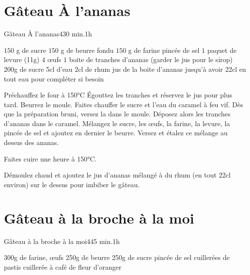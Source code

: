 {\section{Gâteau À l'ananas}
\begin{recette}{Gâteau À l'ananas}{4}{30 min.}{1h}
\begin{ingredients}
\ingredient[gâteau]
\ingredient $150$ g de sucre
\ingredient $150$ g de beurre fondu
\ingredient $150$ g de farine
 pincée de sel
\ingredient $1$ paquet de levure (11g)
\ingredient $4$ œufs
\ingredient $1$ boite de tranches d'ananas (garder le jus pour le sirop)
\ingredient[caramel]
\ingredient 200g de sucre
\ingredient 5cl d'eau
\ingredient 2cl de rhum
\ingredient jus de la boite d'ananas jusqu'à avoir 22cl en tout
\ingredient eau pour compléter si besoin
\end{ingredients}

\begin{preparation}
\etape Préchauffez le four à 150°C
\etape Égouttez les tranches et réservez le jus pour plus tard.
\etape Beurrez le moule. 
\etape Faites chauffer le sucre et l'eau du caramel à feu vif. Dès que la préparation bruni, versez la dans le moule. 
\etape Déposez alors les tranches d'ananas dans le caramel.
\etape Mélangez le sucre, les œufs, la farine, la levure, la pincée de sel et ajoutez en dernier le beurre.
\etape Versez et étalez ce mélange au dessus des ananas.
\end{preparation}

\begin{cuisson}
Faites cuire une heure à 150°C.

Démoulez chaud et ajoutez le jus d'ananas mélangé à du rhum (en tout 22cl environ) sur le dessus pour imbiber le gâteau.
\end{cuisson}
\end{recette}

\section{Gâteau à la broche à la moi}
\begin{recette}{Gâteau à la broche à la moi}{4}{45 min.}{1h}
\begin{ingredients}
\ingredient 300g de farine,
 œufs
\ingredient 250g de beurre
\ingredient 250g de sucre
 pincée de sel
 cuillerées de pastis
 cuillerée à café de fleur d’oranger
\end{ingredients}


\end{recette}}
